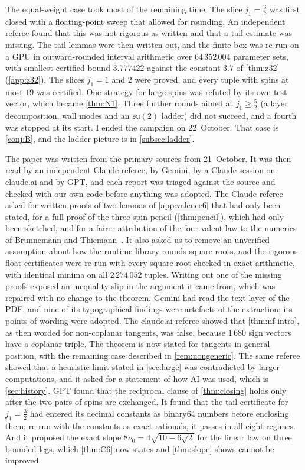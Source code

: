 The equal-weight case took most of the remaining time. The slice $j_1=\frac32$ was first
closed with a floating-point sweep that allowed for rounding. An independent referee found
that this was not rigorous as written and that a tail estimate was missing. The tail lemmas
were then written out, and the finite box was re-run on a GPU in outward-rounded interval
arithmetic over $64\,352\,004$ parameter sets, with smallest certified bound $3.777422$
against the constant $3.7$ of \cref{thm:z32} (\cref{app:z32}). The slices $j_1=1$ and $2$
were proved, and every tuple with spins at most $19$ was certified. One strategy for large
spins was refuted by its own test vector, which became \cref{thm:N1}. Three further rounds
aimed at $j_1\ge\frac52$ (a layer decomposition, wall modes and an $\mathfrak{su}(2)$
ladder) did not succeed, and a fourth was stopped at its start. I ended the campaign on
22~October. That case is \cref{conj:B}, and the ladder picture is in \cref{subsec:ladder}.

The paper was written from the primary sources from 21~October. It was then read by an
independent Claude referee, by Gemini, by a Claude session on claude.ai and by GPT, and each
report was triaged against the source and checked with our own code before anything was
adopted. The Claude referee asked for written proofs of two lemmas of \cref{app:valence6}
that had only been stated, for a full proof of the three-spin pencil
(\cref{thm:pencil}), which had only been sketched, and for a fairer attribution of the
four-valent law to the numerics of Brunnemann and Thiemann~\cite{BT2006}. It also asked us to
remove an unverified assumption about how the runtime library rounds square roots, and the
rigorous-float certificates were re-run with every square root checked in exact arithmetic,
with identical minima on all $2\,274\,052$ tuples. Writing out one of the missing proofs
exposed an inequality slip in the argument it came from, which was repaired with no change
to the theorem. Gemini had read the text layer of the PDF, and nine of its typographical
findings were artefacts of the extraction; its points of wording were adopted. The
claude.ai referee showed that \cref{thm:nf-intro}, as then worded for non-coplanar tangents,
was false, because $1\,680$ sign vectors have a coplanar triple. The theorem is now stated
for tangents in general position, with the remaining case described in
\cref{rem:nongeneric}. The same referee showed that a heuristic limit stated in
\cref{sec:large} was contradicted by larger computations, and it asked for a statement of how
AI was used, which is \cref{sec:history}. GPT found that the reciprocal clause of
\cref{thm:closing} holds only after the two pairs of spins are exchanged. It found that the
tail certificate for $j_1=\frac32$ had entered its decimal constants as binary64 numbers
before enclosing them; re-run with the constants as exact rationals, it passes in all eight
regimes. And it proposed the exact slope $8\nu_0=4\sqrt{10-6\sqrt2}$ for the linear law on
three bounded legs, which \cref{thm:C6} now states and \cref{thm:slope} shows cannot be
improved.
